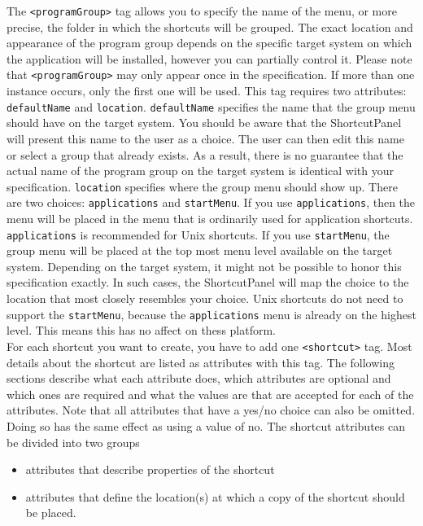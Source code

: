 The \texttt{<programGroup>} tag allows you to specify the name of the
menu, or more precise, the folder in which the shortcuts will be grouped. The exact location and
appearance of the program group depends on the specific target system on
which the application will be installed, however you can partially control it.
Please note that \texttt{<programGroup>} may only appear once
in the specification. If more than one instance occurs, only the first
one will be used. This tag requires two attributes: \texttt{defaultName}
and \texttt{location}. \texttt{defaultName} specifies the name that the
group menu should have on the target system. You should be aware that
the ShortcutPanel will present this name to the user as a choice. The
user can then edit this name or select a group that already exists. As a
result, there is no guarantee that the actual name of the program group
on the target system is identical with your specification.
\texttt{location} specifies where the group menu should show up. There
are two choices: \texttt{applications} and \texttt{startMenu}. If you
use \texttt{applications}, then the menu will be placed in the menu that
is ordinarily used for application shortcuts. \texttt{applications} is recommended for Unix shortcuts.
If you use \texttt{startMenu}, the group menu will be placed at the top most menu
level available on the target system. Depending on the target system, it
might not be possible to honor this specification exactly. In such
cases, the ShortcutPanel will map the choice to the location that most
closely resembles your choice. Unix shortcuts do not need to support the \texttt{startMenu}, because the \texttt{applications} menu is already on the highest level. This means this has no affect on thess platform.\\

For each shortcut you want to create, you have to add one \texttt{<shortcut>} tag.
Most details about the shortcut are listed as attributes with this tag.
The following sections describe what each attribute does, which
attributes are optional and which ones are required and what the values
are that are accepted for each of the attributes. Note that all
attributes that have a yes/no choice can also be omitted. Doing so has
the same effect as using a value of no. The shortcut attributes can be
divided into two groups\\

\begin{itemize}
\item attributes that describe properties of the shortcut
\item attributes that define the location(s) at which a copy of the
      shortcut should be placed.
\end{itemize}\

